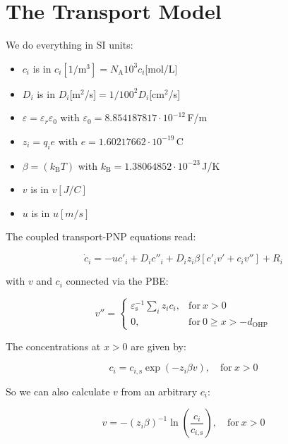 \documentclass[10pt,a4paper]{article}
\begin{document}
\section{The Transport Model}

We do everything in SI units:

\begin{itemize}
\item $c_i$ is in $c_i[1/\mathrm{m}^3] = N_\mathrm{A} 10^3 c_i$[mol/L]
\item $D_i$ is in $D_i$[m$^2$/s]$ = 1/100^2 D_i$[cm$^2$/s]
\item $\varepsilon = \varepsilon_r \varepsilon_0$ with $\varepsilon_0 = 8.854187817\cdot 10^{-12}$\,F/m
\item $z_i = q_i e$ with $e = 1.60217662\cdot 10^{-19}$\,C
\item $\beta = (k_\mathrm{B}T)$ with $k_\mathrm{B} = 1.38064852\cdot 10^{-23}$\,J/K
\item $v$ is in $v[J/C]$
\item $u$ is in $u[m/s]$
\end{itemize}


The coupled transport-PNP equations read:

\begin{equation}
\dot{c}_i =  -u c'_i + D_i c''_i + D_i z_i \beta \left[c'_i v' + c_i v'' \right] + R_i
\end{equation}

with $v$ and $c_i$ connected via the PBE:

\begin{equation}
v'' = \left.
\begin{cases}
\varepsilon_\mathrm{s}^{-1} \sum\limits_i z_i c_i,& \mathrm{for}~ x > 0\\
0, & \mathrm{for}~ 0 \geq x > -d_\mathrm{OHP}
\end{cases}
\right.
\end{equation}

The concentrations at $x>0$ are given by:

\begin{equation}
c_i = c_{i,\mathrm{s}} \exp\left(-z_i \beta v\right), \quad \mathrm{for}~ x > 0
\end{equation}

So we can also calculate $v$ from an arbitrary $c_i$:

\begin{equation}
v = -\left(z_i \beta\right)^{-1}\ln\left(\frac{c_i}{c_{i,\mathrm{s}}}\right), \quad \mathrm{for}~ x > 0
\end{equation}
\end{document}
